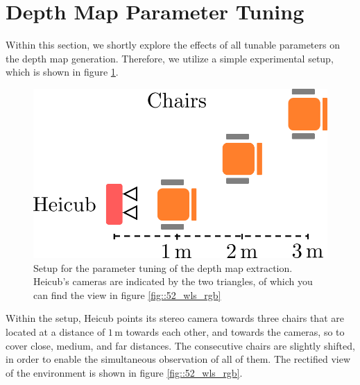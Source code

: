\section{Depth Map Parameter Tuning}
\label{sec::52_dm}
Within this section, we shortly explore the effects of all tunable parameters on the depth map generation. Therefore, we utilize a simple experimental setup, which is shown in figure \ref{fig::52_wls_setup}.
\begin{figure}[h]
	\centering
	\includegraphics[scale=.4]{chapters/05_experiments/02_depth_map_parameter_tuning/wls_setup.png}
	\caption{Setup for the parameter tuning of the depth map extraction. Heicub's cameras are indicated by the two triangles, of which you can find the view in figure \ref{fig::52_wls_rgb}}
	\label{fig::52_wls_setup}
\end{figure}
Within the setup, Heicub points its stereo camera towards three chairs that are located at a distance of $1\,\text{m}$ towards each other, and towards the cameras, so to cover close, medium, and far distances. The consecutive chairs are slightly shifted, in order to enable the simultaneous observation of all of them. The rectified view of the environment is shown in figure \ref{fig::52_wls_rgb}.
